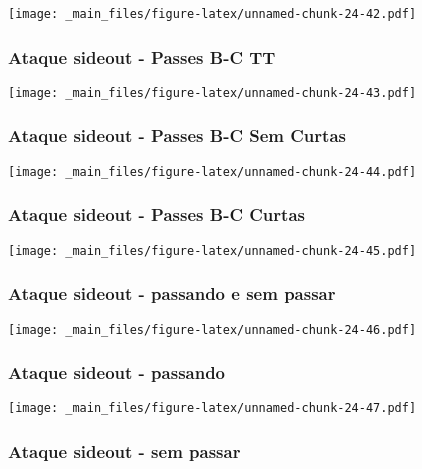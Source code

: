 \documentclass[
]{book}
\begin{document}
\texttt{[image: \_main\_files/figure-latex/unnamed-chunk-24-42.pdf]}

\subsubsection{Ataque sideout - Passes B-C TT}\label{ataque-sideout---passes-b-c-tt-2}

\texttt{[image: \_main\_files/figure-latex/unnamed-chunk-24-43.pdf]}

\subsubsection*{Ataque sideout - Passes B-C Sem Curtas}\label{ataque-sideout---passes-b-c-sem-curtas-2}

\texttt{[image: \_main\_files/figure-latex/unnamed-chunk-24-44.pdf]}

\subsubsection*{Ataque sideout - Passes B-C Curtas}\label{ataque-sideout---passes-b-c-curtas-2}

\texttt{[image: \_main\_files/figure-latex/unnamed-chunk-24-45.pdf]}

\subsubsection*{Ataque sideout - passando e sem passar}\label{ataque-sideout---passando-e-sem-passar-2}

\texttt{[image: \_main\_files/figure-latex/unnamed-chunk-24-46.pdf]}

\subsubsection*{Ataque sideout - passando}\label{ataque-sideout---passando-2}

\texttt{[image: \_main\_files/figure-latex/unnamed-chunk-24-47.pdf]}

\subsubsection*{Ataque sideout - sem passar}\label{ataque-sideout---sem-passar-2}
\end{document}
